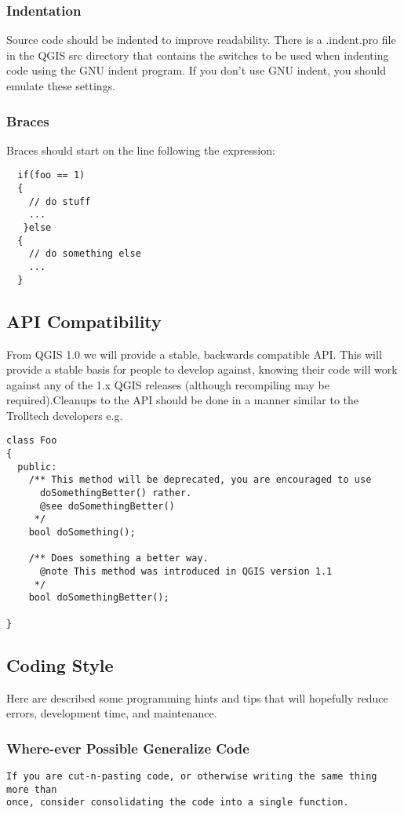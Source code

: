 \hypertarget{toc19}{}
\subsubsection{Indentation}
Source code should be indented to improve readability. There is a .indent.pro
file in the QGIS src directory that contains the switches to be used when
indenting code using the GNU indent program. If you don't use GNU indent, you
should emulate these settings.

\hypertarget{toc20}{}
\subsubsection{Braces}
Braces should start on the line following the expression:

\begin{verbatim}
  if(foo == 1)
  {
    // do stuff
    ...
   }else
  {
    // do something else
    ...
  }
\end{verbatim}

\hypertarget{toc21}{}
\subsection{API Compatibility}
From QGIS 1.0 we will provide a stable, backwards compatible API. This will
provide a stable basis for people to develop against, knowing their code will
work against any of the 1.x QGIS releases (although recompiling may be
required).Cleanups to the API should be done in a manner similar to the
Trolltech developers e.g.

\begin{verbatim}
class Foo 
{
  public:
    /** This method will be deprecated, you are encouraged to use 
      doSomethingBetter() rather.
      @see doSomethingBetter()
     */
    bool doSomething();

    /** Does something a better way.
      @note This method was introduced in QGIS version 1.1
     */
    bool doSomethingBetter();

}
\end{verbatim}

\hypertarget{toc22}{}
\subsection{Coding Style}
Here are described some programming hints and tips that will hopefully reduce
errors, development time, and maintenance.

\hypertarget{toc23}{}
\subsubsection{Where-ever Possible Generalize Code}
\begin{verbatim}
If you are cut-n-pasting code, or otherwise writing the same thing more than
once, consider consolidating the code into a single function.
\end{verbatim}

